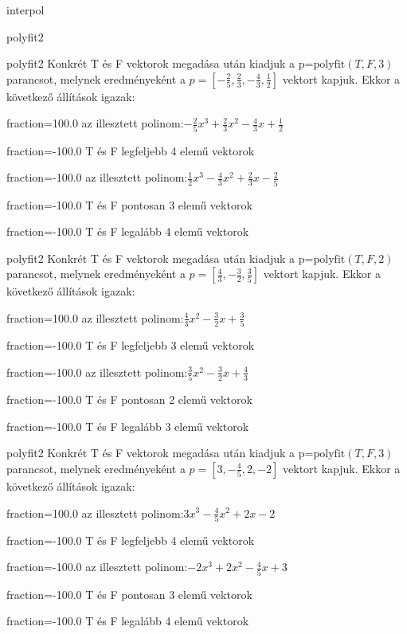\documentclass[12pt]{article}
\begin{document}
\begin{quiz}{interpol}
\begin{multi}[multiple]{polyfit2}
\end{multi}
\begin{multi}[multiple]{polyfit2}
Konkrét T és F vektorok megadása után kiadjuk a p=$\mathrm{polyfit}(T,F,3)$
parancsot, melynek eredményeként a $p=\left[-\frac{2}{5},\frac{2}{3},-\frac{4}{3},\frac{1}{2}\right]$ vektort kapjuk.
Ekkor a következő állítások igazak:
\item[fraction=100.0] az illesztett polinom:$-\frac{2}{5}x^3+\frac{2}{3}x^2-\frac{4}{3}x+\frac{1}{2}$
\item[fraction=-100.0]  T és F legfeljebb 4 elemű vektorok
\item[fraction=-100.0]  az illesztett polinom:$\frac{1}{2}x^3-\frac{4}{3}x^2+\frac{2}{3}x-\frac{2}{5}$
\item[fraction=-100.0]  T és F pontosan 3 elemű vektorok
\item[fraction=-100.0] T és F legalább 4 elemű vektorok
\end{multi}
\begin{multi}[multiple]{polyfit2}
Konkrét T és F vektorok megadása után kiadjuk a p=$\mathrm{polyfit}(T,F,2)$
parancsot, melynek eredményeként a $p=\left[\frac{4}{3},-\frac{3}{2},\frac{3}{5}\right]$ vektort kapjuk.
Ekkor a következő állítások igazak:
\item[fraction=100.0] az illesztett polinom:$\frac{4}{3}x^2-\frac{3}{2}x+\frac{3}{5}$
\item[fraction=-100.0]  T és F legfeljebb 3 elemű vektorok
\item[fraction=-100.0]  az illesztett polinom:$\frac{3}{5}x^2-\frac{3}{2}x+\frac{4}{3}$
\item[fraction=-100.0]  T és F pontosan 2 elemű vektorok
\item[fraction=-100.0] T és F legalább 3 elemű vektorok
\end{multi}
\begin{multi}[multiple]{polyfit2}
Konkrét T és F vektorok megadása után kiadjuk a p=$\mathrm{polyfit}(T,F,3)$
parancsot, melynek eredményeként a $p=\left[3,-\frac{4}{5},2,-2\right]$ vektort kapjuk.
Ekkor a következő állítások igazak:
\item[fraction=100.0] az illesztett polinom:$3x^3-\frac{4}{5}x^2+2x-2$
\item[fraction=-100.0]  T és F legfeljebb 4 elemű vektorok
\item[fraction=-100.0]  az illesztett polinom:$-2x^3+2x^2-\frac{4}{5}x+3$
\item[fraction=-100.0]  T és F pontosan 3 elemű vektorok
\item[fraction=-100.0] T és F legalább 4 elemű vektorok

\end{multi}
\end{quiz}
\end{document}
